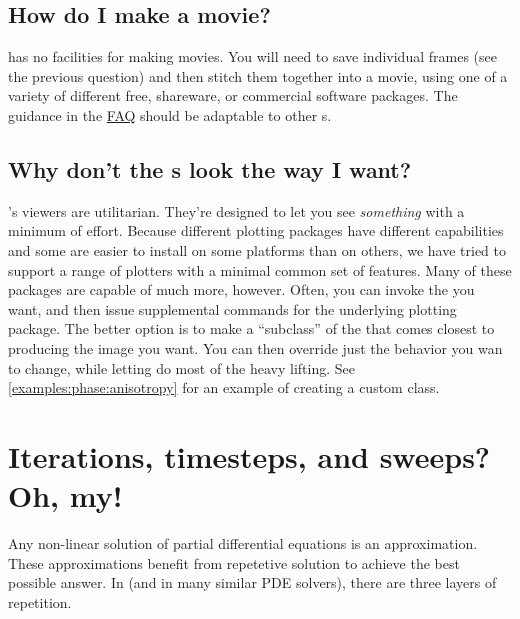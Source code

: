     \subsection{How do I make a movie?} \FiPy{} has no facilities for 
    making movies. You will need to save individual frames (see the 
    previous question) and then stitch them together into a movie, 
    using one of a variety of different free, shareware, or 
    commercial software packages. The guidance in the 
    \href{http://matplotlib.sourceforge.net/faq/howto_faq.html#make-a-movie}{\Matplotlib{}
    FAQ} should be adaptable to other s.
    
    \subsection{Why don't the s look the way I want?}
    \FiPy's viewers are utilitarian. They're designed to let you see 
    \emph{something} with a minimum of effort. Because different 
    plotting packages have different capabilities and some are easier 
    to install on some platforms than on others, we have tried to 
    support a range of \Python{} plotters with a minimal common set of 
    features. Many of these packages are capable of much more, 
    however. Often, you can invoke the  you want, and 
    then issue supplemental commands for the underlying plotting 
    package. The better option is to make a ``subclass'' of the 
    \FiPy{}  that comes closest to producing the image 
    you want. You can then override just the behavior you wan to 
    change, while letting \FiPy{} do most of the heavy lifting. See 
    \ref{examples:phase:anisotropy} for an example of creating a custom 
    \Matplotlib{}  class.
    
    \section{Iterations, timesteps, and sweeps? Oh, my!} 
    \label{FAQ-IterationsTimestepsSweeps}
    Any non-linear solution of partial differential equations is an
    approximation. These approximations benefit from repetetive
    solution to achieve the best possible answer. In \FiPy{} (and in
    many similar PDE solvers), there are three layers of repetition.
    
